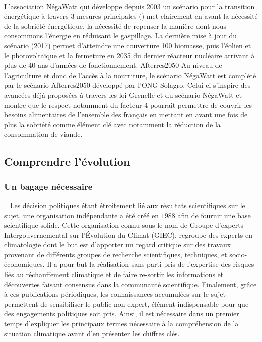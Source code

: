 ~\\ 
L’association NégaWatt qui développe depuis 2003 un scénario pour la transition énergétique
à travers 3 mesures principales () met clairement
en avant la nécessité de la sobriété énergétique, la nécessité de repenser la manière
dont nous consommons l’énergie en réduisant le gaspillage. La dernière mise à jour
du scénario (2017) permet d’atteindre une couverture 100%
biomasse, puis l’éolien et le photovoltaïque et la fermeture en 2035 du dernier
réacteur nucléaire arrivant à plus de 40 ans d’années de fonctionnement.
\href{https://fr.wikipedia.org/wiki/Afterres2050}{Afterres2050}
Au niveau de l’agriculture et donc de l’accès à la nourriture, le scénario NégaWatt
est complété par le scénario Afterres2050 développé par l’ONG Solagro. Celui-ci s’inspire
des avancées déjà proposées à travers les loi Grenelle et du scénario NégaWatt et montre
que le respect notamment du facteur 4 pourrait permettre de couvrir les besoins
alimentaires de l’ensemble des français en mettant en avant une fois de plus la
sobriété comme élément clé avec notamment la réduction de la consommation de viande.





\subsection{Comprendre l’évolution} %
\label{sub:comprendre_l_evolution}

\subsubsection{Un bagage nécessaire} %
\label{ssub:un_bagage_necessaire}
~
Les décision politiques étant étroitement lié aux résultats scientifiques sur le
sujet, une organisation indépendante a été créé en $1988$ afin de fournir une base
scientifique solide. Cette organisation connu sous le nom de
Groupe d'experts Intergouvernemental sur l'Évolution du Climat (GIEC), regroupe
des experts en climatologie dont le but est d’apporter un regard critique sur
des travaux provenant de différents groupes de recherche scientifiques, techniques,
et socio-économiques. Il a pour but la réalisation sans parti-pris de l’expertise
des risques liés au réchauffement climatique et de faire re-sortir les informations
et découvertes faisant consensus dans la communauté scientifique. Finalement, grâce à ces
publications périodiques, les connaissances accumulées sur le sujet permettent de
sensibiliser le public non expert, élément indispensable pour que des engagements
politiques soit pris. Ainsi, il est nécessaire dans un premier temps d’expliquer les principaux termes
nécessaire à la compréhension de la situation climatique avant d’en présenter les chiffres
clés.

